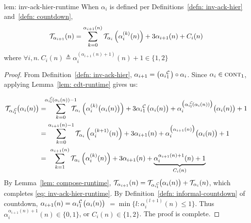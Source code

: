 \begin{uselemcounterof}{lem: inv-ack-hier-runtime}
	When $\alpha_i$ is defined per Definitions~\ref{defn: inv-ack-hier} 
	and~\ref{defn: countdown},
	\begin{equation} \label{eq: inv-ack-hier-runtime}
	\mathcal{T}_{\alpha_{i+1}}(n) = \sum_{k=0}^{\alpha_{i+1}(n)}\mathcal{T}_{\alpha_i}\left( \alpha_i^{(k)}(n)\right) + 3\alpha_{i+1}(n) + C_i(n)
	\end{equation}
	\hspace{7em}where $\forall i, n.~C_i(n) \triangleq \alpha_i^{(\alpha_{i+1}(n) + 1)}(n) + 1 \in \{1, 2\}$
\end{uselemcounterof}

\begin{proof}
	 From Definition~\ref{defn: inv-ack-hier}, $\alpha_{i+1} = \big(\cdt{\alpha_i}{1}\big)\circ \alpha_i$. Since $\alpha_i\in \text{\scshape{cont}}_{1}$, applying Lemma~\ref{lem: cdt-runtime} gives us:

	 \begin{equation*}
	 \begin{aligned}
	 \runtime_{\cdt{\alpha_i}{1}}\big(\alpha_i(n)\big)
	 & = \hspace{-5pt} \sum_{k=0}^{\cdt{\alpha_i}{1}(\alpha_i(n)) - 1} \hspace{-10pt} \runtime_{\alpha_i}\left(\alpha_i^{(k)}\big(\alpha_i(n)\big)\right)
	 + 3\cdt{\alpha_i}{1}\big(\alpha_i(n)\big)
	 + \alpha_i^{\big(\cdt{\alpha_i}{1}(\alpha_i(n))\big)}\big(\alpha_i(n)\big) + 1 \\
	 & = \sum_{k=0}^{\alpha_{i+1}(n) - 1} \runtime_{\alpha_i}\left(\alpha_i^{(k+1)}(n)\right)
	 + 3\alpha_{i+1}(n)
	 + \alpha_i^{\big(\alpha_{i+1}(n)\big)}\big(\alpha_i(n)\big) + 1 \\
	 & = \ \sum_{k=1}^{\alpha_{i+1}(n)} \runtime_{\alpha_i}\left(\alpha_i^{(k)}(n)\right)
	 + 3\alpha_{i+1}(n)
	 + \underbrace{\alpha_i^{\alpha_{i+1}(n) + 1}(n) + 1}_{C_i(n)}
	 \end{aligned}
	 \end{equation*}By Lemma~\ref{lem: compose-runtime}, $\runtime_{\alpha_{i+1}}(n) = \runtime_{\cdt{\alpha_i}{1}}\big(\alpha_i(n)\big) + \runtime_{\alpha_i}(n)$, which completes \eqref{eq: inv-ack-hier-runtime}. By Definition~\ref{defn: informal-countdown} of countdown, $\alpha_{i+1}(n) = \cdt{\alpha_i}{1}\big(\alpha_i(n)\big)$
	 $= \min\big\{l: \alpha_i^{(l+1)}(n)\le 1\big\}$. Thus $\alpha_i^{\alpha_{i+1}(n) + 1}(n) \in \{0, 1\}$, or $C_i(n)\in \{1, 2\}$. The proof is complete.
\end{proof}

